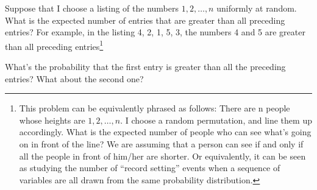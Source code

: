 \documentclass[11pt, twoside]{article}
\begin{document}
\begin{problems}
\problem  {}
Suppose that I choose a listing of the
numbers $1, 2, \ldots, n$ uniformly at random.  What is the expected
number of entries that are greater than all preceding entries?  For
example, in the listing 4, 2, 1, 5, 3, the numbers 4 and 5 are greater
than all preceding entries\footnote{This problem can be equivalently
  phrased as follows: There are n people whose heights are $1, 2,
  \ldots, n$. I choose a random permutation, and line them up
  accordingly. What is the expected number of people who can see
  what's going on in front of the line? We are assuming that a person
  can see if and only if all the people in front of him/her are
  shorter.  Or equivalently, it can be seen as studying the number of
  ``record setting'' events when a sequence of variables are all drawn
  from the same probability distribution.}

\hint What's the probability that the first entry is greater than all the preceding entries? What about the second one? 


          




\end{problems}
\end{document}

